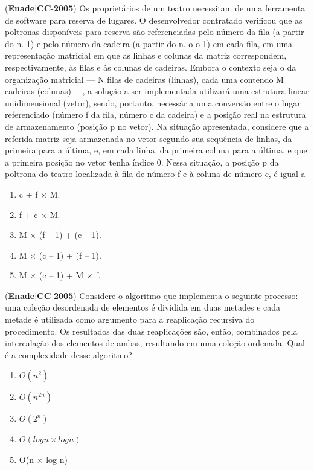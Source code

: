 \documentclass{exam}
\begin{document}
\begin{questions}
\question (\textbf{Enade}$|$\textbf{CC}-\textbf{2005}) Os proprietários de um teatro necessitam de uma
ferramenta de software para reserva de lugares.
O desenvolvedor contratado verificou que as poltronas
disponíveis para reserva são referenciadas pelo número da fila
(a partir do n. 1) e pelo número da cadeira (a partir do n.
o o
1) em cada fila, em uma representação matricial em que as
linhas e colunas da matriz correspondem, respectivamente, às
filas e às colunas de cadeiras. Embora o contexto seja o da
organização matricial — N filas de cadeiras (linhas), cada uma
contendo M cadeiras (colunas) —, a solução a ser
implementada utilizará uma estrutura linear unidimensional
(vetor), sendo, portanto, necessária uma conversão entre o
lugar referenciado (número f da fila, número c da cadeira) e
a posição real na estrutura de armazenamento (posição p no
vetor).
Na situação apresentada, considere que a referida matriz seja
armazenada no vetor segundo sua seqüência de linhas, da primeira
para a última, e, em cada linha, da primeira coluna para a última,
e que a primeira posição no vetor tenha índice 0. Nessa situação,
a posição p da poltrona do teatro localizada à fila de número f e
à coluna de número c, é igual a
	\begin{enumerate}[label=\alph*)]
		\item  c + f × M.
		\item  f + c × M.
		\item  M × (f – 1) + (c – 1).
		\item  M × (c – 1) + (f – 1).
		\item  M × (c – 1) + M × f.

	\end{enumerate}

\question (\textbf{Enade}$|$\textbf{CC}-\textbf{2005}) Considere o algoritmo que implementa o seguinte processo: uma
coleção desordenada de elementos é dividida em duas metades e
cada metade é utilizada como argumento para a reaplicação
recursiva do procedimento. Os resultados das duas reaplicações
são, então, combinados pela intercalação dos elementos de ambas,
resultando em uma coleção ordenada. Qual é a complexidade desse
algoritmo?
	\begin{enumerate}[label=\alph*)]
		\item  $O(n^2)$
		\item  $O(n^{2n})$
		\item  $O(2^n)$
		\item  $O(log n × log n)$
		\item  O(n × log n)


\end{enumerate}
\end{questions}
\end{document}
